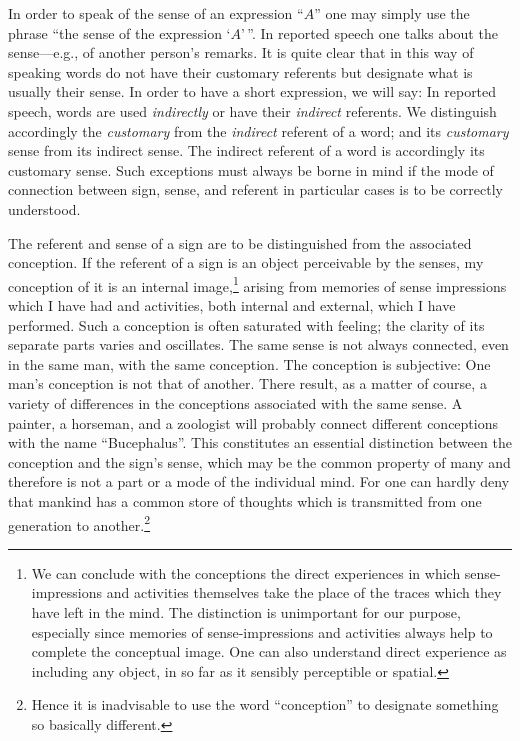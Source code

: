 \documentclass[twoside,12pt]{article}
\begin{document}
In order to speak of the sense of an expression ``$A$'' one may simply
use the phrase ``the sense of the expression `$A$'\,''. In reported
speech one talks about the sense---e.g., of another person's remarks. It
is quite clear that in this way of speaking words do not have their
customary referents but designate what is usually their sense. In
order to have a short expression, we will say: In reported speech,
words are used \emph{indirectly} or have their \emph{indirect}
referents. We distinguish accordingly the \emph{customary} from the
\emph{indirect} referent of a word; and its \emph{customary} sense
from its indirect sense. The indirect referent of a word is
accordingly its customary sense. Such exceptions must always be borne
in mind if the mode of connection between sign, sense, and referent in
particular cases is to be correctly understood.

The referent and sense of a sign are to be distinguished from the
associated conception. If the referent of a sign is an object
perceivable by the senses, my conception of it is an internal
image,\footnote[3]{We can conclude with the conceptions the direct
  experiences in which sense-impressions and activities themselves
  take the place of the traces which they have left in the mind. The
  distinction is unimportant for our purpose, especially since
  memories of sense-impressions and activities always help to complete
  the conceptual image. One can also understand direct experience as
  including any object, in so far as it sensibly perceptible or
  spatial.} arising from memories of sense impressions which I have
had and activities, both internal and external, which I have
performed. Such a conception is often saturated with feeling; the
clarity of its separate parts varies and oscillates. The same sense is
not always connected, even in the same man, with the same conception.
The conception is subjective: One man's conception is not that of
another. There result, as a matter of course, a variety of differences
in the conceptions associated with the same sense. A painter, a
horseman, and a zoologist will probably connect different conceptions
with the name ``Bucephalus''. This constitutes an essential
distinction between the conception and the sign's sense, which may be
the common property of many and therefore is not a part or a mode of
the individual mind. For one can hardly deny that mankind has a common
store of thoughts which is transmitted from one generation to
another.\footnote[4]{Hence it is inadvisable to use the word
  ``conception'' to designate something so basically different.}
\end{document}
